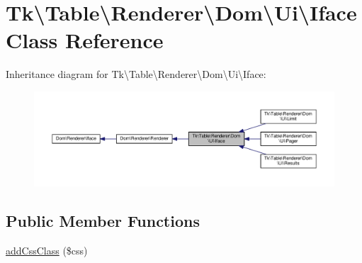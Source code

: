 \hypertarget{classTk_1_1Table_1_1Renderer_1_1Dom_1_1Ui_1_1Iface}{\section{Tk\textbackslash{}Table\textbackslash{}Renderer\textbackslash{}Dom\textbackslash{}Ui\textbackslash{}Iface Class Reference}
\label{classTk_1_1Table_1_1Renderer_1_1Dom_1_1Ui_1_1Iface}
}


Inheritance diagram for Tk\textbackslash{}Table\textbackslash{}Renderer\textbackslash{}Dom\textbackslash{}Ui\textbackslash{}Iface\+:\nopagebreak
\begin{figure}[H]
\begin{center}
\leavevmode
\includegraphics[width=350pt]{classTk_1_1Table_1_1Renderer_1_1Dom_1_1Ui_1_1Iface__inherit__graph}
\end{center}
\end{figure}
\subsection*{Public Member Functions}
\begin{DoxyCompactItemize}
\item 
\hyperlink{classTk_1_1Table_1_1Renderer_1_1Dom_1_1Ui_1_1Iface_a1c08dbab4332e72f3f24d64c27560a45}{add\+Css\+Class} (\$css)
\end{DoxyCompactItemize}
